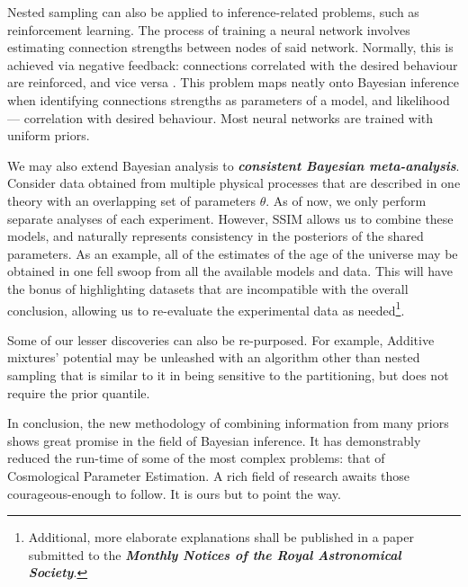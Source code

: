 \documentclass[usenatbib]{mnras}
\begin{document}
Nested sampling can also be applied to inference-related problems,
such as reinforcement learning. The process of training a neural
network involves estimating connection strengths between nodes of said
network. Normally, this is achieved via negative feedback: connections
correlated with the desired behaviour are reinforced, and vice versa
\cite{Kaelbling_1996}. This problem maps neatly onto Bayesian
inference when identifying connections strengths as parameters of a
model, and likelihood --- correlation with desired behaviour. Most
neural networks are trained with uniform priors.


We may also extend Bayesian analysis to \textbf{\emph{consistent
    Bayesian meta-analysis}}. Consider data obtained from multiple
physical processes that are described in one theory with an
overlapping set of parameters $\theta$. As of now, we only perform
separate analyses of each experiment. However, SSIM allows us to
combine these models, and naturally represents consistency in the
posteriors of the shared parameters. As an example, all of the
estimates of the age of the universe may be obtained in one fell swoop
from all the available models and data. This will have the bonus of
highlighting datasets that are incompatible with the overall
conclusion, allowing us to re-evaluate the experimental data as
needed\footnote{Additional, more elaborate explanations shall be
  published in a paper submitted to the \textbf{\emph{Monthly Notices
      of the Royal Astronomical Society}}.}.

Some of our lesser discoveries can also be re-purposed. For example,
Additive mixtures' potential may be unleashed with an algorithm other
than nested sampling that is similar to it in being sensitive to the
partitioning, but does not require the prior quantile.

In conclusion, the new methodology of combining information from many
priors shows great promise in the field of Bayesian inference. It has
demonstrably reduced the run-time of some of the most complex
problems: that of Cosmological Parameter Estimation. A rich field of
research awaits those courageous-enough to follow. It is ours but to point
the way.



\end{document}
